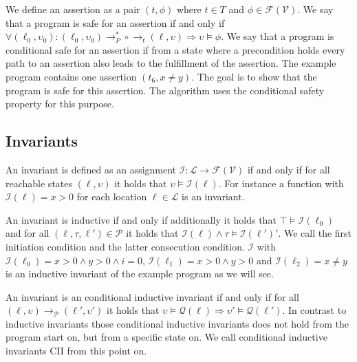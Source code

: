 We define an assertion as a pair $(t, \phi)$ where $t \in T$ and $\phi \in \mathcal{F}(\mathcal{V})$.
We say that a program is safe for an assertion if and only if $\forall (\ell_0, \upsilon_0): (\ell_0, \upsilon_0) \rightarrow_P^* \circ \rightarrow_t (\ell, \upsilon) \Rightarrow \upsilon \models \phi$.
We say that a program is conditional safe for an assertion if from a state where a precondition holds every path to an assertion also leads to the fulfillment of the assertion.
The example program contains one assertion $(t_6, x \neq y)$. The goal is to show that the program is safe for this assertion. The algorithm uses the conditional safety property for this purpose.

\subsection{Invariants}

An invariant is defined as an assignment $\mathcal{I} : \mathcal{L} \rightarrow \mathcal{F}(\mathcal{V})$ if and only if for all reachable states $(\ell, \upsilon)$ it holds that $\upsilon \models \mathcal{I}(\ell)$.
For instance a function with $\mathcal{I}(\ell) = x > 0$ for each location $\ell \in \mathcal{L}$ is an invariant.

An invariant is inductive if and only if additionally it holds that $\top \models \mathcal{I}(\ell_0)$ and for all $(\ell, \tau, \ell') \in \mathcal{P}$ it holds that $\mathcal{I}(\ell) \wedge \tau \models \mathcal{I}(\ell')'$. We call the first initiation condition and the latter consecution condition.
$\mathcal{I}$ with $\mathcal{I}(\ell_0) = x > 0 \wedge y > 0 \wedge i = 0$, $\mathcal{I}(\ell_1) = x > 0 \wedge y > 0$ and $\mathcal{I}(\ell_2) = x \neq y$  is an inductive invariant of the example program as we will see.

An invariant is an conditional inductive invariant if and only if for all $(\ell, \upsilon) \rightarrow_\mathcal{P} (\ell', \upsilon')$ it holds that $\upsilon \models \mathcal{Q}(\ell) \Rightarrow \upsilon' \models \mathcal{Q}(\ell')$.
In contrast to inductive invariants those conditional inductive invariants does not hold from the program start on, but from a specific state on.
We call conditional inductive invariants CII from this point on.


